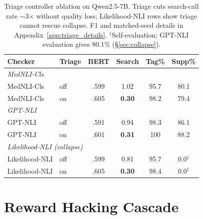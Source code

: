 \documentclass[11pt]{article}
\begin{document}
\begin{table}[t]
\centering\small
\setlength{\tabcolsep}{4pt}
\begin{tabular}{@{}llcccc@{}}
\toprule
\textbf{Checker} & \textbf{Triage}
  & \textbf{BERT} & \textbf{Search} & \textbf{Tag\%} & \textbf{Supp\%} \\
\midrule
\multicolumn{6}{l}{\textit{MedNLI-Cls}} \\
MedNLI-Cls   & off  & .599 & 1.02 & 95.7 & 80.1 \\
MedNLI-Cls   & on   & .605 & \textbf{0.30} & 98.2 & 79.4 \\
\midrule
\multicolumn{6}{l}{\textit{GPT-NLI}} \\
GPT-NLI      & off  & .591 & 0.94 & 98.3 & 86.1 \\
GPT-NLI      & on   & .601 & \textbf{0.31} & 100 & 88.2 \\
\midrule
\multicolumn{6}{l}{\textit{Likelihood-NLI (collapse)}} \\
Likelihood-NLI & off  & .599 & 0.81 & 95.7 & 0.0$^{\ddagger}$ \\
Likelihood-NLI & on   & .605 & \textbf{0.30} & 98.4 & 0.0$^{\ddagger}$ \\
\bottomrule
\end{tabular}
\caption{Triage controller ablation on Qwen2.5-7B. 
Triage cuts search-call rate $\sim$3$\times$ without 
quality loss; Likelihood-NLI rows show triage cannot 
rescue collapse. F1 and matched-seed details in 
Appendix~\ref{app:triage_details}.
$^{\ddagger}$Self-evaluation; GPT-NLI evaluation 
gives 80.1\% (\S\ref{sec:collapse}).}
\label{tab:triage_ablation}
\end{table}









\section{Reward Hacking Cascade}
\label{sec:cascade}
\end{document}
